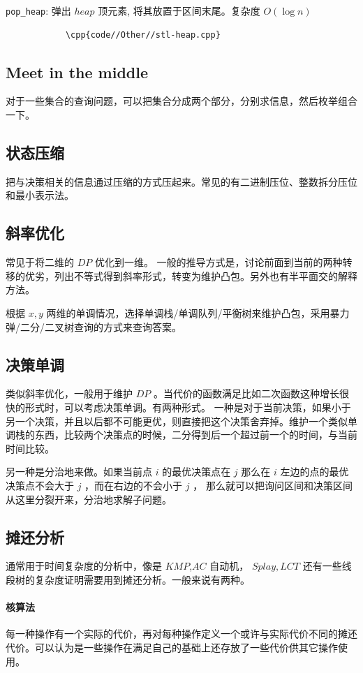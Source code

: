 \documentclass[UTF-8]{ctexart}
\newcommand{\cpp}[1]{\inputminted[bgcolor=bg,breaklines,breakanywhere=true]{c++}{#1}}
\begin{document}
			\texttt{pop\_heap}: 弹出 $heap$ 顶元素, 将其放置于区间末尾。复杂度 $O(\log n)$
			
			\begin{verbatim}
			\cpp{code//Other//stl-heap.cpp}
			\end{verbatim}

		\subsection{Meet in the middle}
		对于一些集合的查询问题，可以把集合分成两个部分，分别求信息，然后枚举组合一下。
		\subsection{状态压缩}
		把与决策相关的信息通过压缩的方式压起来。常见的有二进制压位、整数拆分压位和最小表示法。
		\subsection{斜率优化}
		常见于将二维的 $DP$ 优化到一维。
		一般的推导方式是，讨论前面到当前的两种转移的优劣，列出不等式得到斜率形式，转变为维护凸包。另外也有半平面交的解释方法。
		
		根据 $x,y$ 两维的单调情况，选择单调栈/单调队列/平衡树来维护凸包，采用暴力弹/二分/二叉树查询的方式来查询答案。
		\subsection{决策单调}
		类似斜率优化，一般用于维护 $DP$ 。当代价的函数满足比如二次函数这种增长很快的形式时，可以考虑决策单调。有两种形式。
		一种是对于当前决策，如果小于另一个决策，并且以后都不可能更优，则直接把这个决策舍弃掉。维护一个类似单调栈的东西，比较两个决策点的时候，二分得到后一个超过前一个的时间，与当前时间比较。
		
		另一种是分治地来做。如果当前点 $i$ 的最优决策点在 $j$ 那么在 $i$ 左边的点的最优决策点不会大于 $j$ ，而在右边的不会小于 $j$ ， 那么就可以把询问区间和决策区间从这里分裂开来，分治地求解子问题。
		\subsection{摊还分析}
		通常用于时间复杂度的分析中，像是 $KMP$,$AC$ 自动机， $Splay,LCT$ 还有一些线段树的复杂度证明需要用到摊还分析。一般来说有两种。
		\paragraph{核算法} 每一种操作有一个实际的代价，再对每种操作定义一个或许与实际代价不同的摊还代价。可以认为是一些操作在满足自己的基础上还存放了一些代价供其它操作使用。
\end{document}
